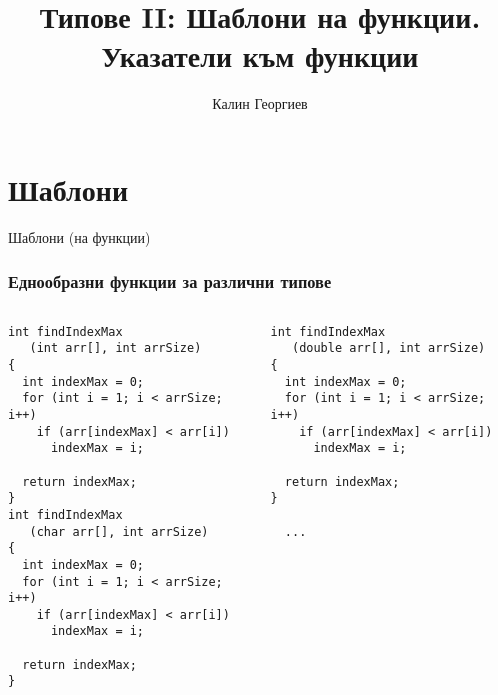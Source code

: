 \documentclass{beamer}
\begin{document}
\title[Обектно ориентирано програмиране]{Типове II: Шаблони на функции. Указатели към функции} 
\author{Калин Георгиев} 
\frame{\titlepage} 

\section{Шаблони} 


\begin{frame}
\centerline{Шаблони (на функции)}
\end{frame}


\begin{frame}[fragile]
\frametitle{Еднообразни функции за различни типове}



\begin{columns}[t]
  \begin{column}{0.5\textwidth}

\begin{flushleft}
\begin{lstlisting}
int findIndexMax 
   (int arr[], int arrSize)
{
  int indexMax = 0;
  for (int i = 1; i < arrSize; i++)
    if (arr[indexMax] < arr[i])
      indexMax = i;

  return indexMax;
}
int findIndexMax 
   (char arr[], int arrSize)
{
  int indexMax = 0;
  for (int i = 1; i < arrSize; i++)
    if (arr[indexMax] < arr[i])
      indexMax = i;

  return indexMax;
}
\end{lstlisting}  
\end{flushleft}

  \end{column}
  \begin{column}{0.5\textwidth}
\begin{flushleft}
\begin{lstlisting}
int findIndexMax 
   (double arr[], int arrSize)
{
  int indexMax = 0;
  for (int i = 1; i < arrSize; i++)
    if (arr[indexMax] < arr[i])
      indexMax = i;

  return indexMax;
}

  ...

\end{lstlisting}  
\end{flushleft}

  \end{column}
\end{columns}


\end{frame}
\end{document}
